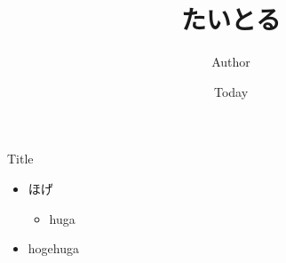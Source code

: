 \documentclass[14pt,dvipdfmx]{beamer} %
\title{たいとる}
\author{Author}
\date{Today}
\begin{document}
\begin{frame}
\titlepage
\end{frame}

\begin{frame}
\begin{block}{Title}
\begin{itemize}
 \item ほげ
  \begin{itemize}
  \item huga
  \end{itemize}
 \item hogehuga
\end{itemize}
\end{block}
\end{frame}
\end{document}
